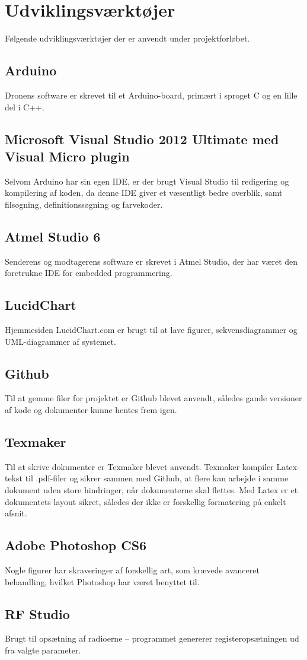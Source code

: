 \documentclass[Main]{subfiles}
\begin{document}
\section{Udviklingsværktøjer}
Følgende udviklingsværktøjer der er anvendt under projektforløbet.

\subsection{Arduino}
Dronens software er skrevet til et Arduino-board, primært i sproget C og en lille del i C++.

\subsection{Microsoft Visual Studio 2012 Ultimate med Visual Micro plugin}
Selvom Arduino har sin egen IDE, er der brugt Visual Studio til redigering og kompilering af koden, da denne IDE giver et væsentligt bedre overblik, samt filsøgning, definitionssøgning og farvekoder.

\subsection{Atmel Studio 6}
Senderens og modtagerens software er skrevet i Atmel Studio, der har været den foretrukne IDE for embedded programmering.

\subsection{LucidChart}
Hjemmesiden LucidChart.com er brugt til at lave figurer, sekvensdiagrammer og UML-diagrammer af systemet.

\subsection{Github}
Til at gemme filer for projektet er Github blevet anvendt, således gamle versioner af kode og dokumenter kunne hentes frem igen.

\subsection{Texmaker}
Til at skrive dokumenter er Texmaker blevet anvendt.
Texmaker kompiler Latex-tekst til .pdf-filer og sikrer sammen med Github, at flere kan arbejde i samme dokument uden store hindringer, når dokumenterne skal flettes.
Med Latex er et dokumentets layout sikret, således der ikke er forskellig formatering på enkelt afsnit.

\subsection{Adobe Photoshop CS6}
Nogle figurer har skraveringer af forskellig art, som krævede avanceret behandling, hvilket Photoshop har været benyttet til.

\subsection{RF Studio}
Brugt til opsætning af radioerne -- programmet genererer registeropsætningen ud fra valgte parameter.
\end{document}
